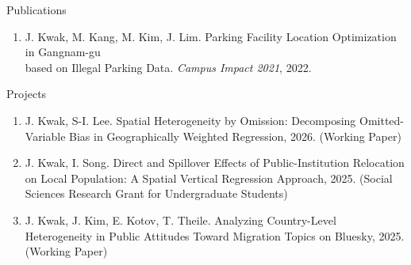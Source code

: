\documentclass{resume} %
\begin{document}
	\begin{rSection}{Publications}
		\begin{enumerate}
			\item J. Kwak, M. Kang, M. Kim, J. Lim. Parking Facility Location Optimization in Gangnam-gu \\
			based on Illegal Parking Data. \textit{Campus Impact 2021}, 2022.
		\end{enumerate}
	\end{rSection}
	\begin{rSection}{Projects}
		\begin{enumerate}
			\item J. Kwak, S-I. Lee. Spatial Heterogeneity by Omission: Decomposing Omitted-Variable Bias in Geographically Weighted Regression, 2026. (Working Paper)
			\item J. Kwak, I. Song. Direct and Spillover Effects of Public-Institution Relocation on Local Population: A Spatial Vertical Regression Approach, 2025.
			(Social Sciences Research Grant for Undergraduate Students)
			\item J. Kwak, J. Kim, E. Kotov, T. Theile. Analyzing Country-Level Heterogeneity in Public Attitudes
			Toward Migration Topics on Bluesky, 2025. (Working Paper)
		\end{enumerate}
	\end{rSection}
\end{document}

